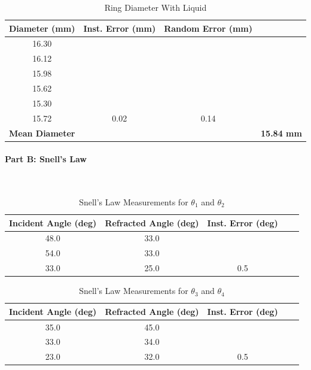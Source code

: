 \documentclass[12pt]{article}
\begin{document}
\begin{table}[H]
\centering
\caption{Ring Diameter With Liquid}
\scriptsize 
\begin{tabular}{ccccc}
\toprule
\textbf{Diameter (mm)} & \textbf{Inst. Error (mm)} & \textbf{Random Error (mm)} \\
\midrule
16.30 & & \\
16.12 & & \\
15.98 & & \\
15.62 & & \\
15.30 & & \\
15.72 &0.02 &0.14 \\
\midrule
\multicolumn{3}{l}{\textbf{Mean Diameter}} & \multicolumn{2}{l}{\textbf{15.84 mm}} \\
\bottomrule
\end{tabular}
\end{table}

\paragraph{Part B: Snell's Law} \mbox{}\\
\begin{table}[H]
\centering
\caption{Snell's Law Measurements for $\theta_1$ and $\theta_2$}
\scriptsize 
\begin{tabular}{ccccc}
\toprule
\textbf{Incident Angle (deg)} & \textbf{Refracted Angle (deg)} & \textbf{Inst. Error (deg)} \\
\midrule
48.0 & 33.0& \\
54.0 & 33.0 & \\
33.0 & 25.0 & 0.5\\
\bottomrule
\end{tabular}
\end{table}

\begin{table}[H]
\centering
\caption{Snell's Law Measurements for $\theta_3$ and $\theta_4$}
\scriptsize 
\begin{tabular}{ccccc}
\toprule
\textbf{Incident Angle (deg)} & \textbf{Refracted Angle (deg)} & \textbf{Inst. Error (deg)} \\
\midrule
35.0 & 45.0 & \\
33.0 & 34.0 & \\
23.0 & 32.0 & 0.5\\
\bottomrule
\end{tabular}
\end{table}
\end{document}
